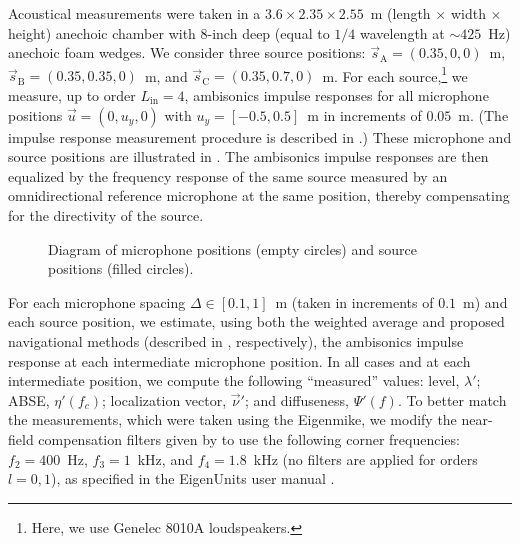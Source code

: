 Acoustical measurements were taken in a $3.6 \times 2.35 \times 2.55$~m (length $\times$ width $\times$ height) anechoic chamber with 8-inch deep (equal to $1/4$ wavelength at $\sim425$~Hz) anechoic foam wedges.
We consider three source positions: $\vec{s}_\textrm{A} = (0.35,0,0)$~m, $\vec{s}_\textrm{B} = (0.35,0.35,0)$~m, and $\vec{s}_\textrm{C} = (0.35,0.7,0)$~m.
For each source,\footnote{Here, we use Genelec 8010A loudspeakers.} we measure, up to order $L_\textrm{in} = 4$, ambisonics impulse responses for all microphone positions $\vec{u} = (0, u_y, 0)$ with $u_y = [-0.5,0.5]$~m in increments of $0.05$~m.
(The impulse response measurement procedure is described in .)
These microphone and source positions are illustrated in .
The ambisonics impulse responses are then equalized by the frequency response of the same source measured by an omnidirectional reference microphone at the same position, thereby compensating for the directivity of the source.

\begin{figure}[t]
\centering
  
  \caption[Diagram of the experimental setup used for validation.]{
  Diagram of microphone positions (empty circles) and source positions (filled circles).}
  \label{fig:10_Experimental_Validation:Experimental_Setup}
\end{figure}

For each microphone spacing $\Delta \in [0.1,1]$~m (taken in increments of $0.1$~m) and each source position,
we estimate, using both the weighted average and proposed navigational methods (described in , respectively), the ambisonics impulse response at each intermediate microphone position.
In all cases and at each intermediate position, we compute the following ``measured'' values: level, $\lambda'$; ABSE, $\eta'(f_c)$; localization vector,  $\vec{\nu}'$; and diffuseness, $\Psi'(f)$.
To better match the measurements, which were taken using the Eigenmike, we modify the near-field compensation filters given by  to use the following corner frequencies: $f_2 = 400$~Hz, $f_3 = 1$~kHz, and $f_4 = 1.8$~kHz (no filters are applied for orders $l = 0,1$), as specified in the EigenUnits user manual \citep[section 4.3]{EigenUnitsManual2018}.